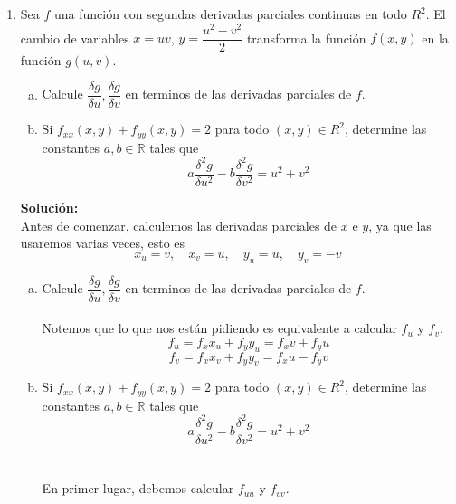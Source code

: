 \documentclass[12pt]{article}
\newenvironment{solucion}
{\begin{mdframed}[backgroundcolor=black!10]
		{\bf Solución:}\\
	}
	{
	\end{mdframed}
}
\newenvironment{preguntas}
{\begin{enumerate}\itemsep12pt
	}
	{
	\end{enumerate}
}
\newcommand{\R}{\mathbb{R}}
\begin{document}
\begin{preguntas}
\begin{solucion}
\begin{enumerate}[a)]
\item $z = x^2+y^2+xy$\tab$x=sen(t), y=e^t$\\
			\\
			$z_t = z_x x_t + z_y y_z = (2x+y)cos(t) + (2y+x)e^t$
\item $w=xe^{y/z}$\tab$x=t^2, y=1-t, z=1+2t$\\
			\\
			{\small$w_t = w_x x_t + w_y y_t + w_z z_t = e^{y/z} 2t + xe^{y/z}\dfrac{1}{z}\cdot(-1) + xe^{y/z} \cdot \dfrac{-1}{z^2}\cdot 2 = e^{y/z}\left(2t - \dfrac{x}{z} - \dfrac{2x}{z^2}\right)$}
\item $w=ln(\sqrt[]{x^2+y^2+z^2})$\tab$x=sen(t), y=cos(t), z=tan(t)$\\
			\\
			$w_t = w_x x_t + w_y y_t + w_z z_t$
			$$ = \dfrac{1}{\sqrt[]{x^2+y^2+z^2}}\cdot \dfrac{1}{2\ \sqrt[]{x^2+y^2+z^2}} (2x\ cos(t) - 2y\ sen(t) + 2z\ sec^2(t))$$
			$$ = \dfrac{1}{x^2+y^2+z^2} (x\ cos(t) - y\ sen(t) + z\ sec^2(t)) \qquad \qquad \qquad \qquad \qquad$$
\end{enumerate}
\end{solucion}
\item Sea $f$ una función con segundas derivadas parciales continuas en todo $R^2$. El cambio de variables $x=uv$, $y=\dfrac{u^2-v^2}{2}$ transforma la función $f(x,y)$ en la función $g(u,v)$.
\begin{enumerate}[a)]
\item Calcule $\dfrac{\delta g}{\delta u}, \dfrac{\delta g}{\delta v}$ en terminos de las derivadas parciales de $f$.
\item Si $f_{xx}(x,y) + f_{yy}(x,y) = 2$ para todo $(x,y) \in R^2$, determine las constantes $a,b \in \R$ tales que
		$$a\dfrac{\delta^2g}{\delta u^2} - b\dfrac{\delta^2 g}{\delta v^2} = u^2 + v^2$$
\end{enumerate}
\begin{solucion}
Antes de comenzar, calculemos las derivadas parciales de $x$ e $y$, ya que las usaremos varias veces, esto es
	$$x_u = v,\quad  x_v = u,\quad y_u = u, \quad y_v = -v$$
\begin{enumerate}[a)]
\item Calcule $\dfrac{\delta g}{\delta u}, \dfrac{\delta g}{\delta v}$ en terminos de las derivadas parciales de $f$.\\
\\
Notemos que lo que nos están pidiendo es equivalente a calcular $f_u$ y $f_v$.
$$f_u = f_x x_u + f_y y_u = f_x v + f_y u $$
$$f_v = f_x x_v + f_y y_v = f_x u - f_y v $$
\item Si $f_{xx}(x,y) + f_{yy}(x,y) = 2$ para todo $(x,y) \in R^2$, determine las constantes $a,b \in \R$ tales que
$$a\dfrac{\delta^2g}{\delta u^2} - b\dfrac{\delta^2 g}{\delta v^2} = u^2 + v^2$$\\
\\
En primer lugar, debemos calcular $f_{uu}$ y $f_{vv}$.\\


\end{enumerate}
\end{solucion}
\end{preguntas}
\end{document}
